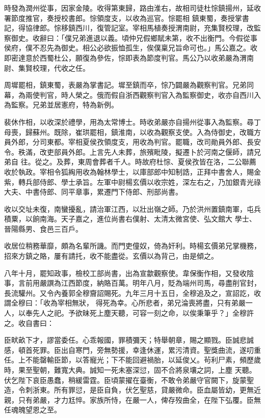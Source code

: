 \begin{pinyinscope}
 時發為潤州從事，因家金陵。收得第東歸，路由淮右，故相司徒杜悰鎮揚州，延收署節度推官，奏授校書郎。悰領度支，以收為巡官。悰罷相
 鎮東蜀，奏授掌書記，得協律郎。悰移鎮西川，復管記室。宰相馬植奏授渭南尉，充集賢校理，改監察御史。收辭曰：「僕兄弟進退以義。頃仲兄假鄉賦未第，收不出衡門。今假從事侯府，僕不忍先為御史。相公必欲振恤孤生，俟僕稟兄旨命可也。」馬公嘉之。收即密達意於西蜀杜公，願復為參佐，悰即表為節度判官。馬公乃以收弟嚴為渭南尉、集賢校理，代收之任。



 周墀罷相，鎮東蜀，表嚴為掌書記。墀至鎮而卒，悰乃闢嚴為觀察判官。兄弟同
 幕，為兩使判官，時人榮之。俄而假自浙西觀察判官入為監察御史，收亦自西川入為監察。兄弟並居憲府，特為新例。



 裴休作相，以收深於禮學，用為太常博士。時收弟嚴亦自揚州從事入為監察。尋丁母喪，歸蘇州。既除，崔珙罷相，鎮淮南，以收為觀察支使。入為侍御史，改職方員外郎，分司東都。宰相夏侯孜領度支，用收為判官。罷職，改司勛員外郎、長安令。秩滿，改吏部員外郎。上言先人未葬，旅殯毗陵，擬遷卜於河南之偃師，請兄弟自
 往。從之。及葬，東周會葬者千人。時故府杜悰、夏侯孜皆在洛，二公聯薦收於執政。宰相令狐綯用收為翰林學士，以庫部郎中知制誥，正拜中書舍人，賜金紫，轉兵部侍郎、學士承旨。左軍中尉楊玄價以收宗姓，深左右之，乃加銀青光祿大夫、中書侍郎、同平章事，累遷門下侍郎、刑部尚書。



 收以交址未復，南蠻擾亂，請治軍江西，以壯出嶺之師。乃於洪州置鎮南軍，屯兵積粟，以餉南海。天子嘉之，進位尚書右僕射、太清太微宮使、弘文館大
 學士、晉陽縣男、食邑三百戶。



 收居位稍務華靡，頗為名輩所譏。而門吏僮奴，倚為奸利。時楊玄價弟兄掌機務，招來方鎮之賂，屢有請托，收不能盡從。玄價以為背己，由是傾之。



 八年十月，罷知政事，檢校工部尚書，出為宣歙觀察使。韋保衡作相，又發收陰事，言前用嚴譔為江西節度，納賂百萬。明年八月，貶為端州司馬，尋盡削官封，長流驩州。又令內養郭全穆齎詔賜死。九年三月十五日，全穆追及之，宣詔訖，收謂全穆曰：「收為宰相無狀，
 得死為幸。心所悲者，弟兄淪喪將盡，只有弟嚴一人，以奉先人之祀。予欲昧死上塵天聽，可容一刻之命，以俟秉筆乎？」全穆許之。收自書曰：



 臣畎畝下才，謬當委任。心乖報國，罪積彌天；特舉朝章，賜之顯戮。臣誠悲誠感，頓首死罪。臣出自寒門，旁無勢援，幸逢休運，累污清資。聖獎曲流，遂叨重任。上不能罄輸臣節，以答寵光；下不能回避禍胎，以延俊乂。茍利尸素，頻歷歲時，果至聖朝，難寬大典。誠知一死未塞深愆，固不合將泉壤之詞，上塵
 天聽。伏乞陛下哀臣愚蠢，稍緩雷霆。臣頃蒙擢在臺衡，不敢令弟嚴守官闕下，旋蒙聖造，令刺浙東。所有罪愆，是臣自負，伏乞聖慈，貸嚴微命。臣血屬皆幼，更無近親，只有弟嚴，才力尪悴。家族所恃，在嚴一人，俾存歿曲全，在陛下弘覆。臣無任魂魄望恩之至。




\end{pinyinscope}
